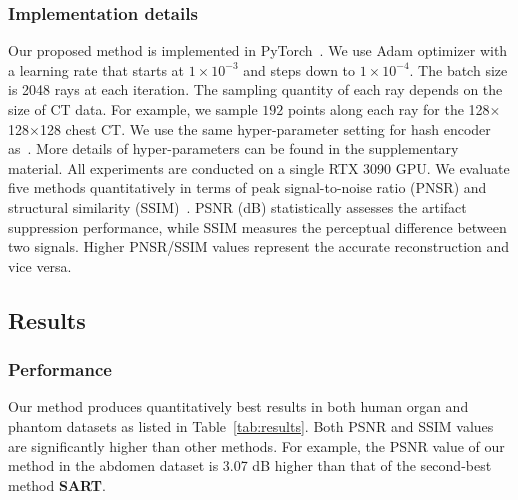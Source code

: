 \documentclass[runningheads]{llncs}
\begin{document}
\subsubsection{Implementation details}
Our proposed method is implemented in PyTorch~\cite{NEURIPS2019_9015}. We use Adam optimizer with a learning rate that starts at $1\times10^{-3}$ and steps down to $1\times10^{-4}$. The batch size is 2048 rays at each iteration. The sampling quantity of each ray depends on the size of CT data. For example, we sample $192$ points along each ray for the 128$\times$128$\times$128 chest CT. We use the same hyper-parameter setting for hash encoder as~\cite{mueller2022instant}. More details of hyper-parameters can be found in the supplementary material. All experiments are conducted on a single RTX 3090 GPU. We evaluate five methods quantitatively in terms of peak signal-to-noise ratio (PNSR) and structural similarity (SSIM)~\cite{wang2004image}. PSNR (dB) statistically assesses the artifact suppression performance, while SSIM measures the perceptual difference between two signals. Higher PNSR/SSIM values represent the accurate reconstruction and vice versa.

\subsection{Results}
\subsubsection{Performance} 
Our method produces quantitatively best results in both human organ and phantom datasets as listed in Table~\ref{tab:results}. Both PSNR and SSIM values are significantly higher than other methods. For example, the PSNR value of our method in the abdomen dataset is 3.07 dB higher than that of the second-best method \textbf{SART}. 
\end{document}
